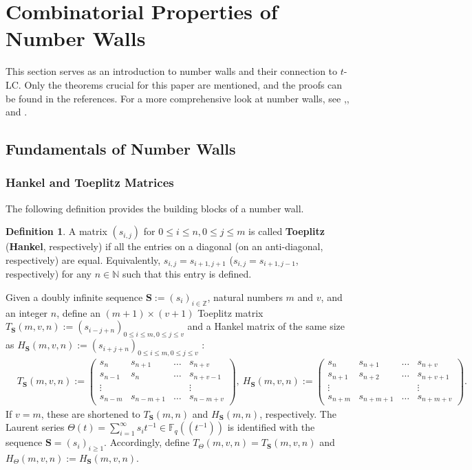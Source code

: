 \documentclass{article}
\theoremstyle{definition}
\newtheorem{definition}[theorem]{Definition}
\newcommand{\F}{\mathbb{F}}
\numberwithin{equation}{subsection}
\begin{document}
\section{Combinatorial Properties of Number Walls} \label{Sect: NW_intro}
\noindent This section serves as an introduction to number walls and their connection to $t$-LC. Only the theorems crucial for this paper are mentioned, and the proofs can be found in the references. For a more comprehensive look at number walls, see \cite[Section 3]{Faustin},\cite[pp 85-89]{Conway1995TheBO}, \cite{Lunnon2009} and \cite{numbwall}.
\subsection{Fundamentals of Number Walls}
\subsubsection*{Hankel and Toeplitz Matrices}
\noindent The following definition provides the building blocks of a number wall.
\begin{definition} \label{Toe}
A matrix $(s_{i,j})$ for $0\le i\le n, 0\le j \le m$ is called \textbf{Toeplitz} (\textbf{Hankel}, respectively) if all the entries on a diagonal (on an anti-diagonal, respectively) are equal. Equivalently, $s_{i,j}=s_{i+1,j+1}$ ($s_{i,j}=s_{i+1,j-1}$, respectively) for any $n\in\mathbb{N}$ such that this entry is defined. 
\end{definition}
\noindent Given a doubly infinite sequence $\mathbf{S}:= (s_i)_{i\in\mathbb{Z}}$, natural numbers $m$ and $v$, and an integer $n$, define an $(m+1)\times (v+1)$ Toeplitz matrix $T_{\mathbf{S}}(m, v,n):= (s_{i-j+n})_{0\le i \le m, 0\le j \le v}$ and a Hankel matrix of the same size as $H_{\mathbf{S}}(m, v,n):= (s_{i+j+n})_{0\le i \le m, 0\le j \le v}$ :\\
\begin{align*}&T_{\mathbf{S}}(m,v,n):=\begin{pmatrix}
s_n & s_{n+1} & \dots & s_{n+v}\\
s_{n-1} & s_{n} & \dots & s_{n+v-1}\\
\vdots &&& \vdots\\
s_{n-m} & s_{n-m+1} & \dots & s_{n-m+v} 
\end{pmatrix},~H_{\mathbf{S}}(m,v,n):=\begin{pmatrix}
s_n & s_{n+1} & \dots & s_{n+v}\\
s_{n+1} & s_{n+2} & \dots & s_{n+v+1}\\
\vdots &&& \vdots\\
s_{n+m} & s_{n+m+1} & \dots & s_{n+m+v}
\end{pmatrix}.&\end{align*} If $v=m$, these are shortened to $T_{\mathbf{S}}(m,n)$ and $H_{\mathbf{S}}(m,n)$, respectively. The Laurent series $\Theta(t)=\sum^\infty_{i=1}s_it^{-1}\in\F_{q}\left(\!\left(t^{-1}\right)\!\right)$ is identified with the sequence $\mathbf{S}=(s_i)_{i\ge1}$. Accordingly, define $T_\Theta(m,v,n)=T_{\mathbf{S}}(m,v,n)$ and $H_\Theta(m,v,n):=H_{\mathbf{S}}(m,v,n)$.\\
\end{document}
